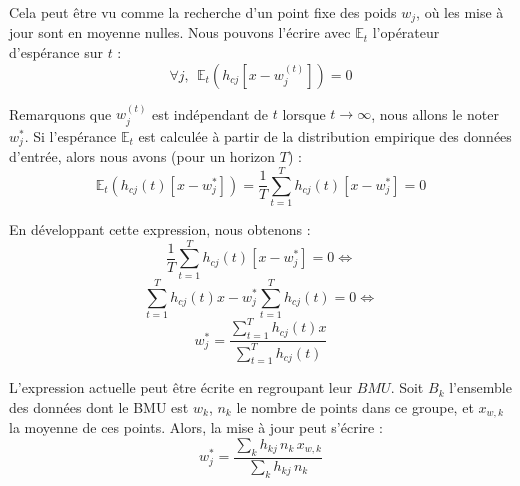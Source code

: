 \documentclass[12pt,a4paper]{report}
\begin{document}
Cela peut être vu comme la recherche d'un point fixe des poids $w_j$, où les mise à jour sont en moyenne nulles. 
Nous pouvons l'écrire avec $\mathbb{E}_t$ l'opérateur d'espérance sur $t$ \cite{Kohonen2012SOM}:
$$ \forall j, \ \  \mathbb{E}_t(h_{cj}[x - w_j^{(t)}]) = 0 $$

Remarquons que $w_j^{(t)}$ est indépendant de $t$ lorsque $t \to \infty$, nous allons le noter $w_j^*$. Si l'espérance $\mathbb{E}_t$ est calculée à partir de la distribution empirique des données d'entrée, 
alors nous avons (pour un horizon $T$) :
$$ \mathbb{E}_t(h_{cj}(t)[x - w_j^*]) = \frac{1}{T} \sum_{t=1}^{T} h_{cj}(t)[x - w_j^*] = 0$$

En développant cette expression, nous obtenons :
$$ \frac{1}{T} \sum_{t=1}^{T} h_{cj}(t)[x - w_j^*] = 0 \Leftrightarrow $$
$$ \sum_{t=1}^{T} h_{cj}(t)x - w_j^*\sum_{t=1}^{T} h_{cj}(t)  = 0 \Leftrightarrow $$
$$ w_j^* = \frac{\sum_{t=1}^{T} h_{cj}(t)x}{\sum_{t=1}^{T} h_{cj}(t)} $$


L'expression actuelle peut être écrite en regroupant leur $BMU$. Soit $B_k$ l'ensemble des données dont le BMU est $w_k$, $n_k$ le nombre de points dans ce groupe, 
et $x_{w,k}$ la moyenne de ces points. Alors, la mise à jour peut s'écrire \cite{Kohonen2012SOM} :
$$w_j^* = \frac{\sum_{k} h_{kj} \, n_k \, x_{w,k}}{\sum_{k} h_{kj} \, n_k}$$
\end{document}
